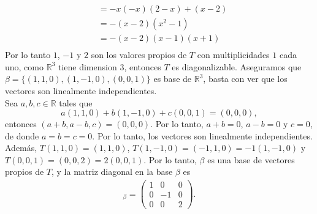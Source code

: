 \documentclass[11pt]{article}
\newcommand{\R}{\mathbb{R}}
\begin{document}
\begin{Solucion}
\begin{enumerate}
\begin{align*}
            &=-x(-x)(2-x) + (x-2) \\ & =-(x-2)(x^2-1)\\ &=-(x-2)(x-1)(x+1)\\
        \end{align*}
        Por lo tanto \(1\), \(-1\) y \(2\) son los valores propios de \(T\) con multiplicidades \(1\) cada uno, como \(\R^3\) 
        tiene dimension 3, entonces \(T\) es diagonalizable. Aseguramos que 
        \(\beta=\{(1,1,0),(1,-1,0),(0,0,1)\} \) es base de \(\R^3\), basta con 
        ver que los vectores son linealmente independientes. \\[10pt]
        Sea \(a,b,c \in \R\) tales que
        \[
            a(1,1,0)+b(1,-1,0)+c(0,0,1)=(0,0,0),
        \]
        entonces \((a+b,a-b,c)=(0,0,0)\). Por lo tanto, \(a+b=0\), \(a-b=0\) y \(c=0\), de donde \(a=b=c=0\). Por lo tanto, los vectores son linealmente independientes. Además,
        \(T(1,1,0)=(1,1,0)\), \(T(1,-1,0)=(-1,1,0)=-1(1,-1,0)\) y \(T(0,0,1)=(0,0,2)=2(0,0,1)\). Por lo tanto, \(\beta\) es una base de vectores propios de  \(T\), y la matriz diagonal en la base \(\beta\) es
        \begin{align*}
            [T]_{\beta} = \begin{pmatrix}
                1 & 0 & 0\\
                0 & -1 & 0\\
                0 & 0 & 2
            \end{pmatrix}.
        \end{align*}
    \end{enumerate}
\end{Solucion}
    
\end{document}
